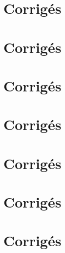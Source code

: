 \documentclass[twoside, a4paper, 12pt, openright, fullpage]{book}
\begin{document}
\section{Corrigés}




\section{Corrigés}




\section{Corrigés}




\section{Corrigés}




\section{Corrigés}




\section{Corrigés}




\section{Corrigés}


\end{document}
